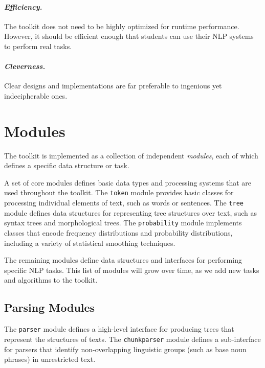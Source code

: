 \documentclass[11pt]{article}
\begin{document}
\paragraph{\textit{Efficiency.}} The toolkit does not need to be highly
optimized for runtime performance.  However, it should be efficient
enough that students can use their NLP systems to perform real tasks.

\paragraph{\textit{Cleverness.}} Clear designs and implementations are
far preferable to ingenious yet indecipherable ones.

\section{Modules}
\label{sec:modules}

The toolkit is implemented as a collection of independent
\emph{modules}, each of which defines a specific data structure or
task.

A set of core modules defines basic data types and processing systems
that are used throughout the toolkit.  The \texttt{token} module
provides basic classes for processing individual elements of text,
such as words or sentences.  The \texttt{tree} module defines data
structures for representing tree structures over text, such as syntax
trees and morphological trees.  The \texttt{probability} module
implements classes that encode frequency distributions and probability
distributions, including a variety of statistical smoothing
techniques.

The remaining modules define data structures and interfaces for
performing specific NLP tasks.  This list of modules will grow over
time, as we add new tasks and algorithms to the toolkit.

\subsection*{Parsing Modules}

The \texttt{parser} module defines a high-level interface for
producing trees that represent the structures of texts.  The
\texttt{chunkparser} module defines a sub-interface for parsers that
identify non-overlapping linguistic groups (such as base noun phrases)
in unrestricted text.
\end{document}
